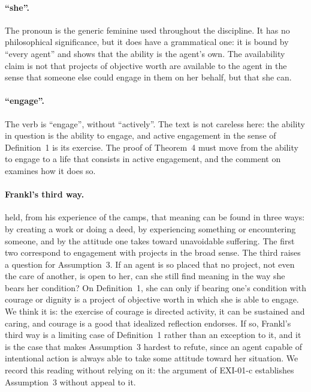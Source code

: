 \paragraph{\enquote{she}.} The pronoun is the generic feminine used throughout the discipline. It has no philosophical significance, but it does have a grammatical one: it is bound by \enquote{every agent} and shows that the ability is the agent's own. The availability claim is not that projects of objective worth are available to the agent in the sense that someone else could engage in them on her behalf, but that she can.

\paragraph{\enquote{engage}.} The verb is \enquote{engage}, without \enquote{actively}. The text is not careless here: the ability in question is the ability to engage, and active engagement in the sense of Definition~1 is its exercise. The proof of Theorem~4 must move from the ability to engage to a life that consists in active engagement, and the comment on  examines how it does so.

\paragraph{Frankl's third way.} \citet{Frankl1962} held, from his experience of the camps, that meaning can be found in three ways: by creating a work or doing a deed, by experiencing something or encountering someone, and by the attitude one takes toward unavoidable suffering. The first two correspond to engagement with projects in the broad sense. The third raises a question for Assumption~3. If an agent is so placed that no project, not even the care of another, is open to her, can she still find meaning in the way she bears her condition? On Definition~1, she can only if bearing one's condition with courage or dignity is a project of objective worth in which she is able to engage. We think it is: the exercise of courage is directed activity, it can be sustained and caring, and courage is a good that idealized reflection endorses. If so, Frankl's third way is a limiting case of Definition~1 rather than an exception to it, and it is the case that makes Assumption~3 hardest to refute, since an agent capable of intentional action is always able to take some attitude toward her situation. We record this reading without relying on it: the argument of EXI-01-c establishes Assumption~3 without appeal to it.

